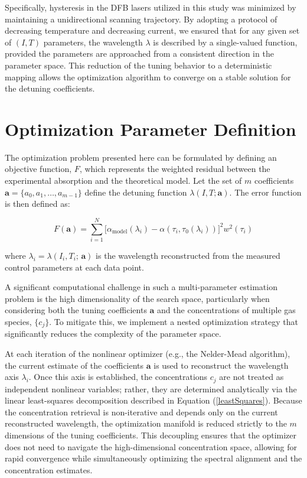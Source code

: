 \documentclass[8pt,a4paper]{report}
\begin{document}
	Specifically, hysteresis in the DFB lasers utilized in this study was minimized by maintaining a unidirectional scanning trajectory. By adopting a protocol of decreasing temperature and decreasing current, we ensured that for any given set of $(I, T)$ parameters, the wavelength $\lambda$ is described by a single-valued function, provided the parameters are approached from a consistent direction in the parameter space. This reduction of the tuning behavior to a deterministic mapping allows the optimization algorithm to converge on a stable solution for the detuning coefficients.
	
	\section{Optimization Parameter Definition}
	The optimization problem presented here can be formulated by defining an objective function, $F$, which represents the weighted residual between the experimental absorption and the theoretical model. Let the set of $m$ coefficients $\mathbf{a} = \{a_0, a_1, \dots, a_{m-1}\}$ define the detuning function $\lambda(I, T; \mathbf{a})$. The error function is then defined as:
	
	\begin{equation}
		F(\mathbf{a}) = \sum_{i=1}^{N} \Big[ \alpha_\mathrm{model}(\lambda_i) - \alpha(\tau_i, \tau_0(\lambda_i)) \Big]^2 w^2(\tau_i)
	\end{equation}
	
	where $\lambda_i = \lambda(I_i, T_i;\,\mathbf{a})$ is the wavelength reconstructed from the measured control parameters at each data point. 
	
	A significant computational challenge in such a multi-parameter estimation problem is the high dimensionality of the search space, particularly when considering both the tuning coefficients $\mathbf{a}$ and the concentrations of multiple gas species, $\{c_j\}$. To mitigate this, we implement a nested optimization strategy that significantly reduces the complexity of the parameter space. 
	
	At each iteration of the nonlinear optimizer (e.g., the Nelder-Mead algorithm), the current estimate of the coefficients $\mathbf{a}$ is used to reconstruct the wavelength axis $\lambda_i$. Once this axis is established, the concentrations $c_j$ are not treated as independent nonlinear variables; rather, they are determined analytically via the linear least-squares decomposition described in Equation (\ref{leastSquares}). Because the concentration retrieval is non-iterative and depends only on the current reconstructed wavelength, the optimization manifold is reduced strictly to the $m$ dimensions of the tuning coefficients. This decoupling ensures that the optimizer does not need to navigate the high-dimensional concentration space, allowing for rapid convergence while simultaneously optimizing the spectral alignment and the concentration estimates.
	
\end{document}

